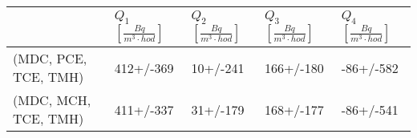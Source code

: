 \begin{tabular}{lllll}
\toprule
{} & $Q_1$ $\left[\si{\frac{Bq}{m^3\cdot hod}}\right]$ & $Q_2$ $\left[\si{\frac{Bq}{m^3\cdot hod}}\right]$ & $Q_3$ $\left[\si{\frac{Bq}{m^3\cdot hod}}\right]$ & $Q_4$ $\left[\si{\frac{Bq}{m^3\cdot hod}}\right]$ \\
\midrule
(MDC, PCE, TCE, TMH) &                                         412+/-369 &                                          10+/-241 &                                         166+/-180 &                                         -86+/-582 \\
(MDC, MCH, TCE, TMH) &                                         411+/-337 &                                          31+/-179 &                                         168+/-177 &                                         -86+/-541 \\
\bottomrule
\end{tabular}
